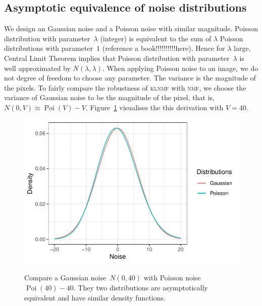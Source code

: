 \subsection{Asymptotic equivalence of noise distributions}
 We design an Gaussian noise and a Poisson noise with similar magnitude. Poisson distribution with parameter~$\lambda$ (integer) is equivalent to the sum of $\lambda$ Poisson distributions with parameter~$1$ (reference a book!!!!!!!!!!here). Hence for $\lambda$ large, Central Limit Theorem implies that Poisson distribution with parameter~$\lambda$ is well approximated by $N(\lambda,\lambda)$. When applying Poisson noise to an image, we do not degree of freedom to choose any parameter. The variance is the magnitude of the pixels. To fairly compare the robustness of \textsc{klnmf} with \textsc{nmf}, we choose the variance of Gaussian noise to be the magnitude of the pixel, that is, $N(0,V)\approx \operatorname{Poi}(V)-V$. Figure~\ref{noise} visualises the this derivation with $V=40$.
\begin{figure}
  \centering
  \includegraphics{resource/noise}\\
  \caption{Compare a Gaussian noise~$N(0,40)$ with Poisson noise $\operatorname{Poi}(40)-40$. They two distributions are asymptotically equivalent and have similar density functions.}\label{noise}
\end{figure}

